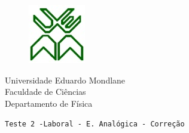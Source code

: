 \documentclass[11pt,a4paper,twoside]{report}
\author{Bartolomeu J. Ubisse}
\begin{document}
\begin{figure}[htb]

\centering
\includegraphics[scale=1]{UEM-logotipo}
\end{figure}
\centering
{ \Large Universidade Eduardo Mondlane}\\[0.3cm] 
\large Faculdade de Ci\^encias\\[0.2cm]
 \large Departamento de F\'isica\\[0.5cm]

\begin{flushleft}
\tt Teste 2 -Laboral - E. Anal\'ogica - Corre\c c\~ao \\
\hrulefill
\end{flushleft}
\end{document}
